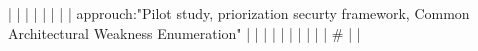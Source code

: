 |    |            |      |                                                                      |                                                                                                                                                                          |                                                                                                                                                                                                                                                            |                                                                                                                                                                                                                                                                      |  approuch:"Pilot study, priorization securty framework, Common Architectural Weakness Enumeration"                                                                                                                                                                                                       |                                                                                                                                                                                                                                                                                                                                                                                                                                                                                              |
|    |            |      |                                                                      |                                                                                                                                                                          |                                                                                                                                                                                                                                                            |                                                                                                                                                                                                                                                                      |  #                                                                                                                                                                                                                                                                                                       |                                                                                                                                                                                                                                                                                                                                                                                                                                                                                              |
